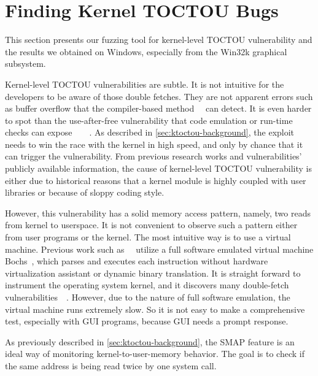 \section{Finding Kernel TOCTOU Bugs}
\label{sec:ktoctou-experiment}


This section presents our fuzzing tool \toolname for kernel-level TOCTOU vulnerability and the results we obtained on Windows, especially from the Win32k graphical subsystem.

Kernel-level TOCTOU vulnerabilities are subtle. It is not intuitive for the developers to be aware of those double fetches. They are not apparent errors such as buffer overflow that the compiler-based method~\cite{nagarakatte2015everything}~\cite{zhang2010intpatch} can detect. It is even harder to spot than the use-after-free vulnerability that code emulation or run-time checks can expose~\cite{feist2016finding}~\cite{chen2020savior}~\cite{lee2015preventing}~\cite{serebryany2012addresssanitizer}. As described in \autoref{sec:ktoctou-background}, the exploit needs to win the race with the kernel in high speed, and only by chance that it can trigger the vulnerability. From previous research works and vulnerabilities' publicly available information, the cause of kernel-level TOCTOU vulnerability is either due to historical reasons that a kernel module is highly coupled with user libraries or because of sloppy coding style. 

However, this vulnerability has a solid memory access pattern, namely, two reads from kernel to userspace. It is not convenient to observe such a pattern either from user programs or the kernel. The most intuitive way is to use a virtual machine. Previous work such as~\cite{jurczyk2013identifying}~\cite{bochspwnreloaded} utilize a full software emulated virtual machine Bochs~\cite{lawton2003bochs}, which parses and executes each instruction without hardware virtualization assistant or dynamic binary translation.  It is straight forward to instrument the operating system kernel, and it discovers many double-fetch vulnerabilities~\cite{jurczyk2013identifying}~\cite{bochspwnreloaded}. However, due to the nature of full software emulation, the virtual machine runs extremely slow. So it is not easy to make a comprehensive test, especially with GUI programs, because GUI needs a prompt response.

As previously described in \autoref{sec:ktoctou-background}, the SMAP feature is an ideal way of monitoring kernel-to-user-memory behavior. The goal is to check if the same address is being read twice by one system call.


